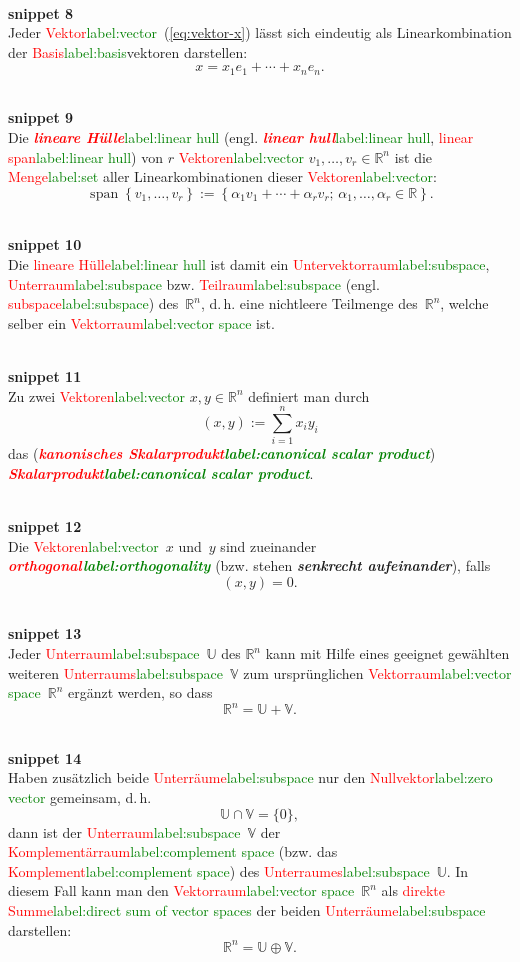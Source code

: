 \documentclass[a4paper,twoside,english,ngerman,deutsch,german,sectrefs,envcountsame,envcountchap]{svmono}
\newcommand{\setref}[2]{\textcolor{red}{#1}\textcolor{green}{#2}}
\newcommand{\snippet}[1]{\\\textbf{snippet #1}\\}
\begin{document}
\snippet{8}
Jeder \setref{Vektor}{label:vector}~(\ref{eq:vektor-x}) lässt sich eindeutig als Linearkombination der \setref{Basis}{label:basis}vektoren darstellen:
\[
x=x_{1}e_{1}+\cdots+x_{n}e_{n}.
\]

\snippet{9}
Die \setref{\textbf{\em lineare Hülle}}{label:linear hull} (engl. \setref{\textbf{\em linear hull}}{label:linear hull}, \setref{linear span}{label:linear hull}) von $r$ \setref{Vektoren}{label:vector} $v_{1},\ldots,v_{r}\in{\mathbb{R}}^{n}$ ist die \setref{Menge}{label:set} aller Linearkombinationen dieser \setref{Vektoren}{label:vector}:
\[
{\operatorname{span}}\left\{ v_{1},\ldots,v_{r}\right\} :=\left\{ \alpha_{1}v_{1}+\cdots+\alpha_{r}v_{r};\,\alpha_{1},\ldots,\alpha_{r}\in{\mathbb{R}}\right\} .
\]

\snippet{10}
Die \setref{lineare Hülle}{label:linear hull} ist damit ein \setref{Untervektorraum}{label:subspace}, \setref{Unterraum}{label:subspace} bzw. \setref{Teilraum}{label:subspace} (engl. \setref{subspace}{label:subspace}) des~${\mathbb{R}}^{n}$, d.\,h. eine nichtleere Teilmenge des~${\mathbb{R}}^{n}$, welche selber ein \setref{Vektorraum}{label:vector space} ist.

\snippet{11}
Zu zwei \setref{Vektoren}{label:vector} $x,y\in{\mathbb{R}}^{n}$ definiert man durch
\begin{equation}
(x,y):=\sum_{i=1}^{n}x_{i}y_{i}\label{eq:skalarprodukt}
\end{equation}
das (\textbf{\em \setref{kanonisches Skalarprodukt}{label:canonical scalar product}}) \textbf{\em \setref{Skalarprodukt}{label:canonical scalar product}}.

\snippet{12}
Die \setref{Vektoren}{label:vector}~$x$ und~$y$ sind zueinander \textbf{\em \setref{orthogonal}{label:orthogonality}} (bzw. stehen \textbf{\em senkrecht aufeinander}), falls
\[
(x,y)=0.
\]

\snippet{13}
Jeder \setref{Unterraum}{label:subspace}~$\mathbb{U}$ des ${\mathbb{R}}^{n}$ kann mit Hilfe eines geeignet gewählten weiteren \setref{Unterraums}{label:subspace}~$\mathbb{V}$ zum ursprünglichen
\setref{Vektorraum}{label:vector space}~${\mathbb{R}}^{n}$ ergänzt werden, so dass
\[
{\mathbb{R}}^{n}=\mathbb{U}+\mathbb{V}.
\]

\snippet{14}
Haben zusätzlich beide \setref{Unterräume}{label:subspace} nur den \setref{Nullvektor}{label:zero vector} gemeinsam, d.\,h.
\[
\mathbb{U}\cap\mathbb{V}=\{0\},
\]
dann ist der \setref{Unterraum}{label:subspace}~$\mathbb{V}$ der \setref{Komplementärraum}{label:complement space} (bzw. das \setref{Komplement}{label:complement space}) des \setref{Unterraumes}{label:subspace}~$\mathbb{U}$. In diesem Fall kann man den \setref{Vektorraum}{label:vector space}~${\mathbb{R}}^{n}$ als \setref{direkte Summe}{label:direct sum of vector spaces} der beiden \setref{Unterräume}{label:subspace} darstellen:
\[
{\mathbb{R}}^{n}=\mathbb{U}\oplus\mathbb{V}.
\]
\end{document}
